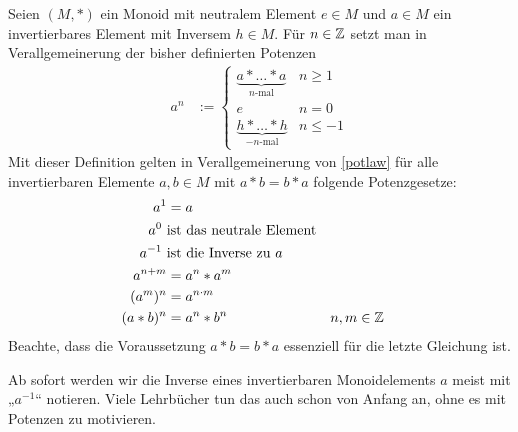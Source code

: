 \begin{de}
 Seien $(M,*)$ ein Monoid mit neutralem Element $e\in M$ und $a\in M$ ein invertierbares Element mit Inversem $h\in M$. Für $n\in {\mathbb Z}$ setzt man in Verallgemeinerung der bisher definierten Potenzen
 \begin{align*}
  a^n & := \begin{cases}
            \underbrace{a* \ldots * a}_{n\text{-mal}} & n \geq 1 \\
            e & n= 0 \\
            \underbrace{h * \ldots * h}_{-n\text{-mal}} & n \leq -1
           \end{cases}
 \end{align*}
Mit dieser Definition gelten in Verallgemeinerung von \cref{potlaw} für alle invertierbaren Elemente $a,b\in M$ mit $a*b=b*a$ folgende Potenzgesetze:
\begin{align*}
 a^1 & = a \\
 a^0\ & \text{ist das neutrale Element}  \\
 a^{-1}\ & \text{ist die Inverse zu $a$} \\
 a^{n+m} & = a^n*a^m \\
 (a^m)^n & = a^{n\cdot m} \\
 (a*b)^n & = a^n*b^n && n,m\in {\mathbb Z}
\end{align*}
Beachte, dass die Voraussetzung $a*b=b*a$ essenziell für die letzte Gleichung ist.
\end{de}




\begin{bem}
 Ab sofort werden wir die Inverse eines invertierbaren Monoidelements $a$ meist mit „$a^{-1}$“ notieren. Viele Lehrbücher tun das auch schon von Anfang an, ohne es mit Potenzen zu motivieren.
\end{bem}







